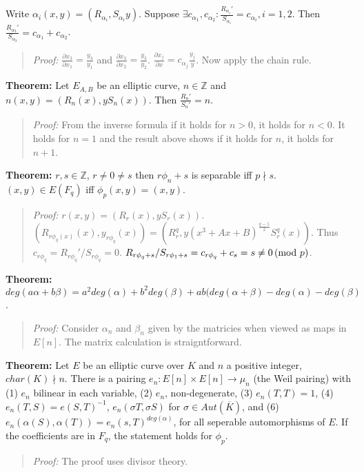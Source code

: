 Write $\alpha_i(x,y)= (R_{\alpha_i}, S_{\alpha_i}y)$.  Suppose $\exists c_{\alpha_1}, c_{\alpha_2}:
{\frac {R_{\alpha_i}'} {S_{\alpha_i}}}= c_{\alpha_i}, i=1,2$.  Then
${\frac {R_{\alpha_3}'} {S_{\alpha_3}}}= c_{\alpha_1} + c_{\alpha_2}$.
\begin{quote}
\emph{Proof:} 
${\frac {\partial x_3} {\partial x_1}} = {\frac {y_3} {y_1}}$ and
${\frac {\partial x_3} {\partial x_2}} = {\frac {y_3} {y_2}}$.
${\frac {\partial x_j} {\partial x}} = c_{\alpha_j}{\frac {y_j} {y}}$.  Now apply the
chain rule.
\end{quote}
{\bf Theorem:} Let $E_{A,B}$ be an elliptic curve, $n \in {\mathbb Z}$ and
$n(x,y)= (R_n(x), yS_n(x))$.  Then
${\frac {R_{n}'} {S_{n}'}}= n$.
\begin{quote}
\emph{Proof:} 
From the inverse formula if it holds for $n>0$, it holds for $n<0$.  It holds for $n=1$ and the
result above shows if it holds for $n$, it holds for $n+1$.
\end{quote}
{\bf Theorem:} $r, s \in \mathbb{Z}$, $r \neq 0 \neq s$ then $r\phi_n+s$ is separable iff $p \nmid s$.
$(x,y) \in E(F_q)$ iff $\phi_p(x,y)= (x,y)$.
\begin{quote}
\emph{Proof:}
$r(x,y)= (R_r(x), y S_r(x))$. 
$(R_{r \phi_q(x)}(x), y_{r\phi_q}(x))= (R_r^q, y(x^3+Ax+B)^{\frac {q-1} 2} S_r^q(x))$.
Thus $c_{r \phi_q}= R_{r \phi_q}'/S_{r \phi_q}=0$.
$R_{r \phi_q +s} /S_{r \phi_1 +s} = c_{r \phi_q} + c_s = s \neq 0 \thinspace \textnormal{(mod } p \textnormal{)}$.
\end{quote}
{\bf Theorem:} $deg(a \alpha + b \beta)= a^2 deg( \alpha ) + b^2 deg( \beta ) + ab (deg (\alpha + \beta )
- deg( \alpha ) -deg( \beta )$.
\begin{quote}
\emph{Proof:}
Consider $\alpha_n$ and $\beta_n$ given by the matricies when viewed as maps in $E[n]$.  The matrix calculation
is straigntforward.
\end{quote}
{\bf Theorem:} Let $E$ be an elliptic curve over $K$ and $n$ a positive integer, $char(K) \nmid n$.  There
is a pairing $e_n : E[n] \times E[n] \rightarrow \mu_n$ (the Weil pairing) with 
(1) $e_n$ bilinear in each variable, (2) $e_n$, non-degenerate, (3) $e_n(T,T)=1$,
(4) $e_n(T,S)= e(S, T)^{-1}$, $e_n( \sigma T , \sigma S)$ for $\sigma \in Aut ( \overline{K} )$, and
(6) $e_n( \alpha (S) , \alpha (T))= e_n(s, T)^{deg( \alpha )}$, for all seperable automorphisms of $E$.
If the coefficients are in $F_q$, the statement holds for $\phi_p$.
\begin{quote}
\emph{Proof:}  The proof uses divisor theory.
\end{quote}
